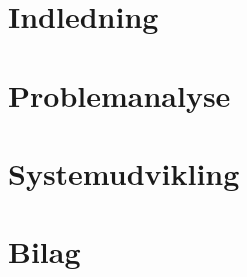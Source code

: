 



\chapter{Indledning}\label{Indledning}



\chapter{Problemanalyse}


 


\chapter{Systemudvikling} 




\begingroup
\raggedright




\endgroup

\appendix
\chapter{Bilag}

%


